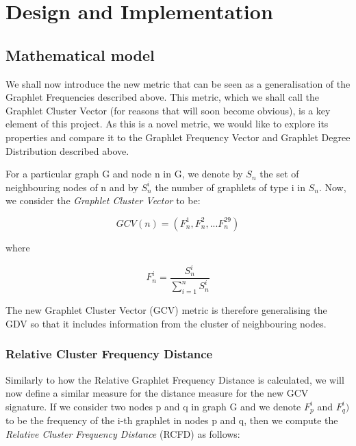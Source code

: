 \chapter{Design and Implementation}

\section{Mathematical model}

We shall now introduce the new metric that can be seen as a generalisation of
the Graphlet Frequencies described above. This metric, which we shall call the
Graphlet Cluster Vector (for reasons that will soon become obvious), is
a key element of this project. As this is a novel metric, we would like to
explore its properties and compare it to the Graphlet Frequency Vector and
Graphlet Degree Distribution described above. 

For a particular graph G and node n in G, we denote by \( S_n \) the
set of neighbouring nodes of n and by \( S_n^i\) the number of graphlets of
type i in \( S_n \). Now, we consider the \emph{Graphlet Cluster Vector} to be:

$$ GCV(n) = \left(F_n^1, F_n^2, ... F_n^{29}\right)$$

where

\begin{equation}
 F_n^i = \frac{S_n^i}{\sum_{i=1}^{n}S_n^i}
\end{equation}
 
The new Graphlet Cluster Vector (GCV) metric is therefore
generalising the GDV so that it includes information from the cluster of
neighbouring nodes. 

\subsection{Relative Cluster Frequency Distance}

Similarly to how the Relative Graphlet Frequency Distance is calculated, we
will now define a similar measure for the distance measure for the new GCV
signature. If we consider two nodes p and q in graph G and we denote \(F_p^i\)
and \(F_q^i)\) to be the frequency of the i-th graphlet in nodes p and q, then
we compute the \emph{Relative Cluster Frequency Distance} (RCFD) as follows:


